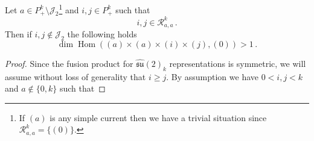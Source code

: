 \documentclass[10pt,a4paper]{amsart}
\begin{document}
\begin{thm}\label{su2thm}
   Let $a\in P_+^k\setminus \mathcal{J}_2$\footnote{If $(a)$ is any simple current then we have a trivial situation since $\mathcal{R}^k_{a,a}=\{(0)\}$.} and  $i,j\in P_+^k$ such that 
    \begin{equation}\label{con}
    i,j\in \mathcal{R}^k_{a,a}\,.
    \end{equation}
    Then if $i,j\notin \mathcal{J}_2$ the following holds
   \begin{equation}
       \operatorname{dim}\operatorname{Hom}\left((a)\times(a)\times(i)\times(j),(0)\right) >1 \,.
   \end{equation}
\end{thm}

\begin{proof}
Since the fusion product for  $\widehat{\mathfrak{su}}(2)_k$ representations is symmetric, we will assume without loss of generality that $i\geq j$. 
By assumption we have  $0<i,j<k$ 
and $a\notin\{0,k\}$ such that   %

\end{proof}
\end{document}
